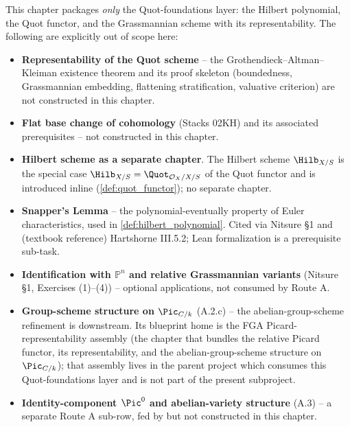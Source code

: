 This chapter packages \emph{only} the Quot-foundations layer: the Hilbert
polynomial, the Quot functor, and the Grassmannian scheme with its
representability. The following are explicitly out of scope here:
\begin{itemize}
  \item \textbf{Representability of the Quot scheme} -- the
    Grothendieck--Altman--Kleiman existence theorem and its proof skeleton
    (boundedness, Grassmannian embedding, flattening stratification,
    valuative criterion) are not constructed in this chapter.
  \item \textbf{Flat base change of cohomology} (Stacks 02KH) and its
    associated prerequisites -- not constructed in this chapter.
  \item \textbf{Hilbert scheme as a separate chapter}. The Hilbert scheme
    \(\Hilb_{X/S}\) is the special case
    \(\Hilb_{X/S} = \Quot_{\mathcal{O}_X/X/S}\) of the Quot functor and is
    introduced inline (\cref{def:quot_functor}); no separate chapter.
  \item \textbf{Snapper's Lemma} -- the polynomial-eventually property of
    Euler characteristics, used in \cref{def:hilbert_polynomial}. Cited
    via Nitsure \S 1 and (textbook reference) Hartshorne III.5.2;
    Lean formalization is a prerequisite sub-task.
  \item \textbf{Identification with \(\mathbb{P}^n\) and relative
    Grassmannian variants} (Nitsure \S 1, Exercises (1)--(4)) --
    optional applications, not consumed by Route A.
  \item \textbf{Group-scheme structure on \(\Pic_{C/k}\)} (A.2.c) -- the
    abelian-group-scheme refinement is downstream. Its blueprint home is the
    FGA Picard-representability assembly (the chapter that bundles the relative
    Picard functor, its representability, and the abelian-group-scheme
    structure on \(\Pic_{C/k}\)); that assembly lives in the parent project
    which consumes this Quot-foundations layer and is not part of the present
    subproject.
  \item \textbf{Identity-component \(\Pic^0\) and abelian-variety
    structure} (A.3) -- a separate Route A sub-row, fed by but not
    constructed in this chapter.
\end{itemize}

